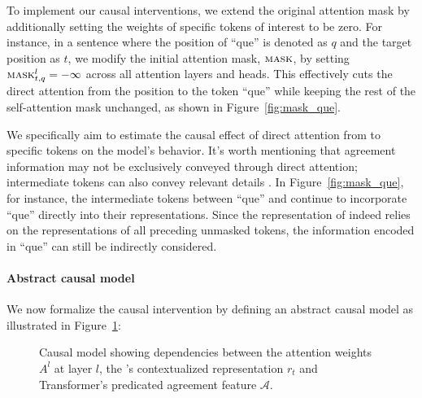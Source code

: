 To implement our causal interventions, we extend the original attention mask by additionally setting the weights of specific tokens of interest to be zero. For instance, in a sentence where the position of ``que'' is denoted as $q$ and the target position as $t$, we modify the initial attention mask, $\textsc{mask}$, by setting $\textsc{mask}^{l}_{t,q} = -\infty$ across all attention layers and heads. This effectively cuts the direct attention from the \target position to the token ``que'' while keeping the rest of the self-attention mask unchanged, as shown in Figure~\ref{fig:mask_que}. 

We specifically aim to estimate the causal effect of direct attention from \target to specific tokens on the model's behavior. It's worth mentioning that agreement information may not be exclusively conveyed through direct attention; intermediate tokens can also convey relevant details \citep{klafka-ettinger-2020-spying,lasri-etal-2022-probing}. In Figure~\ref{fig:mask_que}, for instance, the intermediate tokens between ``que'' and \target continue to incorporate ``que'' directly into their representations. Since the representation of \target indeed
relies on the representations of all preceding unmasked tokens, the information encoded in ``que'' can still be indirectly considered. 

\paragraph{Abstract causal model} We now formalize the causal intervention by defining an abstract causal model as illustrated in Figure~\ref{fig:causal_dag}:

\begin{figure}[ht]
    \centering
    \begin{center}
\end{center}
    \caption{Causal model showing dependencies between the attention weights $A^l$ at layer $l$, the \target's contextualized representation $r_t$ and Transformer's predicated agreement feature $\mathcal{A}$.}
    \label{fig:causal_dag}
\end{figure}

